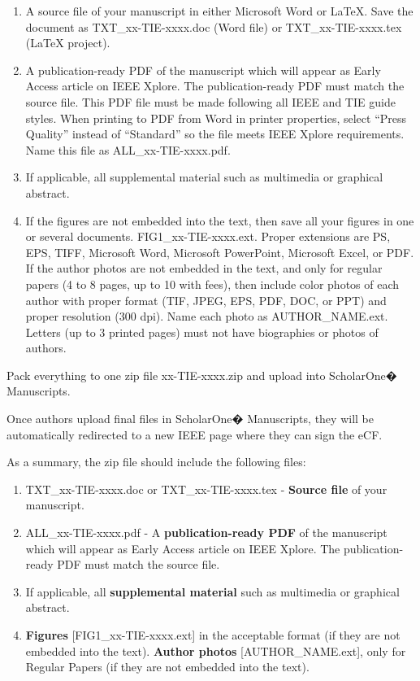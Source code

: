 \documentclass[journal]{IEEEtranTICPS}
\begin{document}
\begin{enumerate}[1)]
	\item A source file of your manuscript in either Microsoft Word or LaTeX. Save the document as TXT\_xx-TIE-xxxx.doc (Word file) or TXT\_xx-TIE-xxxx.tex (LaTeX project).
	\item  A publication-ready PDF of the manuscript which will appear as Early Access article on IEEE Xplore. The publication-ready PDF must match the source file. This PDF file must be made following all IEEE and TIE guide styles. When printing to PDF from Word in printer properties, select  ``Press Quality'' instead of ``Standard'' so the file meets IEEE Xplore requirements. Name this file as ALL\_xx-TIE-xxxx.pdf.
	\item If applicable, all supplemental material such as multimedia or graphical abstract.
	\item If the figures are not embedded into the text, then save all your figures in one or several documents. FIG1\_xx-TIE-xxxx.ext. Proper extensions are PS, EPS, TIFF, Microsoft Word, Microsoft PowerPoint, Microsoft Excel, or PDF.	If the author photos are not embedded in the text, and only for regular papers (4 to 8 pages, up to 10 with fees), then include color photos of each author with proper format (TIF, JPEG, EPS, PDF, DOC, or PPT) and proper resolution (300 dpi). Name each photo as AUTHOR\_NAME.ext. Letters (up to 3 printed pages) must not have biographies or photos of authors.
\end{enumerate}

Pack everything to one zip file xx-TIE-xxxx.zip and upload into ScholarOne� Manuscripts.

Once authors upload final files in ScholarOne� Manuscripts, they will be automatically redirected to a new IEEE page where they can sign the eCF.

As a summary, the zip file should include the following files:

\begin{enumerate}[1)]
	\item TXT\_xx-TIE-xxxx.doc or TXT\_xx-TIE-xxxx.tex - \textbf{Source file} of your manuscript.	
	\item ALL\_xx-TIE-xxxx.pdf -  A \textbf{publication-ready PDF} of the manuscript which will appear as Early Access article on IEEE Xplore. The publication-ready PDF must match the source file.
	\item If applicable, all \textbf{supplemental material} such as multimedia or graphical abstract.
	\item \textbf{Figures} [FIG1\_xx-TIE-xxxx.ext] in the acceptable format (if they are not embedded into the text). \textbf{Author photos} [AUTHOR\_NAME.ext], only for Regular Papers (if they are not embedded into the text).
	
\end{enumerate}
\end{document}
